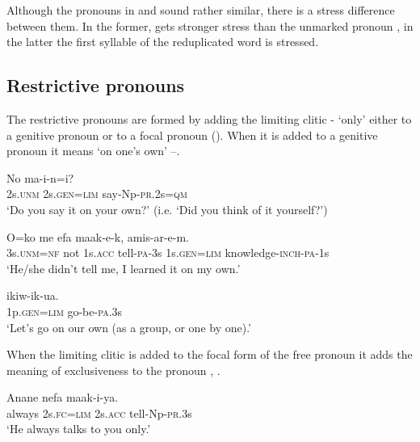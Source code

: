 Although the pronouns in  and  sound rather similar, there is a stress difference between them. In the former,  gets stronger stress than the unmarked pronoun  , in the latter the first syllable of the reduplicated word is stressed.

\subsection{Restrictive pronouns}\label{sec:3.5.7}
{}
The restrictive pronouns are formed by adding the limiting clitic - `only' either to a genitive pronoun or to a focal pronoun (). When it is added to a genitive pronoun it means `on one's own' --.

\ea%
\label{ex:3:x605}
\gll No  ma-i-n=i? \\
2s.\textsc{unm} 2s.\textsc{gen}=\textsc{lim} say-Np-\textsc{pr}.2s=\textsc{qm}\\
\glt`Do you say it on your own?' (i.e. `Did you think of it yourself?')
\z

\ea%
\label{ex:3:x606}
\gll O=ko me efa maak-e-k,  amis-ar-e-m.\\
3s.\textsc{unm}=\textsc{nf} not 1s.\textsc{acc} tell-\textsc{pa}-3s 1s.\textsc{gen}=\textsc{lim} knowledge-\textsc{inch}-\textsc{pa}-1s\\
\glt`He/she didn't tell me, I learned it on my own.'
\z

\ea%
\label{ex:3:x607}
\gll {} ikiw-ik-ua. \\
1p.\textsc{gen}=\textsc{lim} go-be-\textsc{pa}.3s\\
\glt`Let's go on our own (as a group, or one by one).'
\z

When the limiting clitic is added to the focal form of the free pronoun it adds the meaning of exclusiveness to the pronoun , .

\ea%
\label{ex:3:x608}
\gll Anane  nefa maak-i-ya. \\
always 2s.\textsc{fc}=\textsc{lim} 2s.\textsc{acc} tell-Np-\textsc{pr}.3s\\
\glt`He always talks to you only.'
\z

